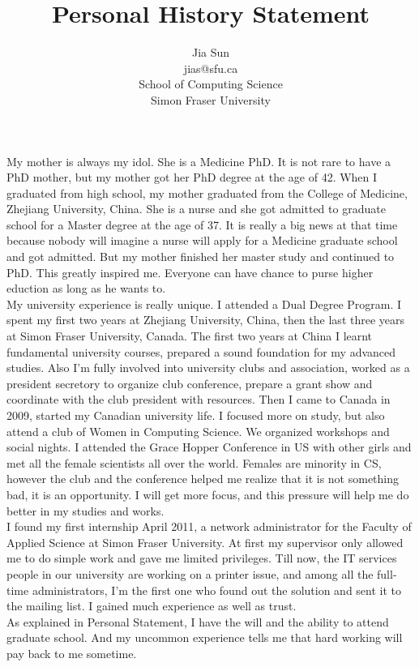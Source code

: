 \documentclass{article}
\title{Personal History Statement}
\author{Jia Sun\\jias@sfu.ca\\School of Computing Science\\Simon Fraser University}
\begin{document}
\maketitle%

My mother is always my idol. She is a Medicine PhD. It is not rare to have a PhD mother, but my mother got her PhD degree at the age of 42. When I graduated from high school, my mother graduated from the College of Medicine, Zhejiang University, China. She is a nurse and she got admitted to graduate school for a Master degree at the age of 37. It is really a big news at that time because nobody will imagine a nurse will apply for a Medicine graduate school and got admitted. But my mother finished her master study and continued to PhD. This greatly inspired me. Everyone can have chance to purse higher eduction as long as he wants to.  \\

My university experience is really unique. I attended a Dual Degree Program. I spent my first two years at Zhejiang University, China, then the last three years at Simon Fraser University, Canada. The first two years at China I learnt fundamental university courses, prepared a sound foundation for my advanced studies. Also I'm fully involved into university clubs and association, worked as a president secretory to organize club conference, prepare a grant show and coordinate with the club president with resources. Then I came to Canada in 2009, started my Canadian university life. I focused more on study, but also attend a club of Women in Computing Science. We organized workshops and social nights. I attended the Grace Hopper Conference in US with other girls and met all the female scientists all over the world. Females are minority in CS, however the club and the conference helped me realize that it is not something bad, it is an opportunity. I will get more focus, and this pressure will help me do better in my studies and works. \\


I found my first internship April 2011, a network administrator for the Faculty of Applied Science at Simon Fraser University. At first my supervisor only allowed me to do simple work and gave me limited privileges. Till now, the IT services people in our university are working on a printer issue, and among all the full-time administrators, I'm the first one who found out the solution and sent it to the mailing list. I gained much experience as well as trust. \\

As explained in Personal Statement, I have the will and the ability to attend graduate school. And my uncommon experience tells me that hard working will pay back to me sometime. \\
\end{document}
